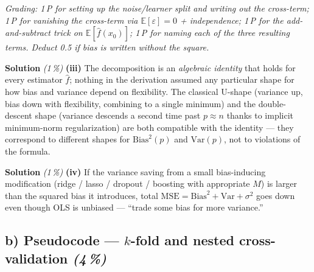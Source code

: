 \documentclass[11pt,a4paper]{article}
\newcommand{\subpoints}[1]{\textit{(#1\,\%)}}
\newcommand{\sol}{\noindent\textbf{Solution}}
\begin{document}
\noindent\emph{Grading: 1\,P for setting up the noise/learner split and writing out the cross-term;
1\,P for vanishing the cross-term via $\mathbb E[\varepsilon]=0$ + independence; 1\,P for the
add-and-subtract trick on $\mathbb E[\hat f(x_0)]$; 1\,P for naming each of the three resulting
terms. Deduct 0.5 if bias is written without the square.}

\medskip
\sol{} \subpoints{1} \textbf{(iii)} The decomposition is an \emph{algebraic identity} that holds
for every estimator $\hat f$; nothing in the derivation assumed any particular shape for how bias
and variance depend on flexibility. The classical U-shape (variance up, bias down with flexibility,
combining to a single minimum) and the double-descent shape (variance descends a second time past
$p \approx n$ thanks to implicit minimum-norm regularization) are both compatible with the
identity --- they correspond to different shapes for $\mathrm{Bias}^2(p)$ and $\mathrm{Var}(p)$,
not to violations of the formula.

\medskip
\sol{} \subpoints{1} \textbf{(iv)} If the variance saving from a small bias-inducing modification
(ridge / lasso / dropout / boosting with appropriate $M$) is larger than the squared bias it
introduces, total $\mathrm{MSE} = \mathrm{Bias}^2 + \mathrm{Var} + \sigma^2$ goes down even though
OLS is unbiased --- ``trade some bias for more variance.''

\subsection*{b) Pseudocode --- $k$-fold and nested cross-validation \subpoints{4}}
\end{document}
